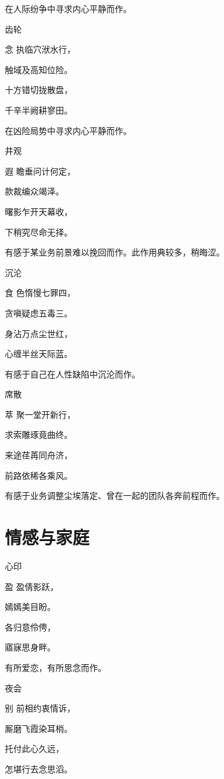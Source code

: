 \documentclass{article}
\newenvironment{poem}[3]{
\begin{minipage}{\textwidth}
\begin{pinyinscope}\begin{center}\Large\linespread{1.4}\selectfont #2\end{center}\end{pinyinscope}
\begin{pinyinscope}
	\begin{center}
	\Large\linespread{1.4}\rmfamily\selectfont #3
}{\end{center}
\end{pinyinscope}
\end{minipage}
}
\begin{document}
在人际纷争中寻求内心平静而作。

\begin{poem}{}{齿轮}
念执临穴{\textsf 洑}水行，

触域及高知位险。

十方错切拢散盘，

千辛半阙耕寥田。
\end{poem}

在凶险局势中寻求内心平静而作。

\begin{poem}{}{井观}
遐瞻垂问计何定，

款{}裁编众竭泽。

曙影乍开天幕收，

下稍究尽命无择。
\end{poem}

有感于某业务前景难以挽回而作。此作用典较多，稍晦涩。

\begin{poem}{}{沉沦}
食色惰慢七罪四，

贪嗔疑虑五毒三。

身沾万点尘世红，

心缠半丝天际蓝。
\end{poem}

有感于自己在人性缺陷中沉沦而作。

\begin{poem}{}{席散}
萃聚一堂开新行，

求索雕琢竟曲终。

来途荏苒同舟济，

前路依稀各乘风。
\end{poem}

有感于业务调整尘埃落定、曾在一起的团队各奔前程而作。

\section{情感与家庭}

\begin{poem}{}{心印}
盈盈倩影跃，

嫣嫣美目盼。

各归意伶俜，

寤寐思身畔。
\end{poem}

有所爱恋，有所思念而作。

\begin{poem}{}{夜会}
别前相约衷情诉，

厮磨飞霞染耳梢。

托付此心{}久远，

怎堪行去念思滔。
\end{poem}
\end{document}
